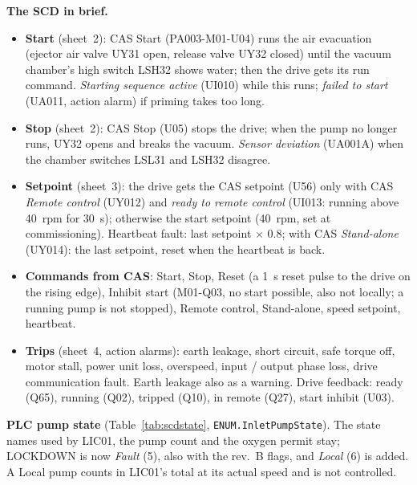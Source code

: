 \documentclass[11pt,a4paper]{article}
\begin{document}
\textbf{The SCD in brief.}
\begin{itemize}[nosep]
  \item \textbf{Start} (sheet~2): CAS Start (PA003-M01-U04) runs the air evacuation (ejector air valve
        UY31 open, release valve UY32 closed) until the vacuum chamber's high switch LSH32 shows water; then
        the drive gets its run command. \emph{Starting sequence active} (UI010) while this runs;
        \emph{failed to start} (UA011, action alarm) if priming takes too long.
  \item \textbf{Stop} (sheet~2): CAS Stop (U05) stops the drive; when the pump no longer runs, UY32 opens
        and breaks the vacuum. \emph{Sensor deviation} (UA001A) when the chamber switches LSL31 and LSH32 disagree.
  \item \textbf{Setpoint} (sheet~3): the drive gets the CAS setpoint (U56) only with CAS \emph{Remote
        control} (UY012) and \emph{ready to remote control} (UI013: running above 40~rpm for 30~s);
        otherwise the start setpoint (40~rpm, set at commissioning). Heartbeat fault: last setpoint
        $\times$ 0.8; with CAS \emph{Stand-alone} (UY014): the last setpoint, reset when the heartbeat is back.
  \item \textbf{Commands from CAS}: Start, Stop, Reset (a 1~s reset pulse to the drive on the rising edge),
        Inhibit start (M01-Q03, no start possible, also not locally; a running pump is not stopped),
        Remote control, Stand-alone, speed setpoint, heartbeat.
  \item \textbf{Trips} (sheet~4, action alarms): earth leakage, short circuit, safe torque off, motor
        stall, power unit loss, overspeed, input / output phase loss, drive communication fault. Earth
        leakage also as a warning. Drive feedback: ready (Q65), running (Q02), tripped (Q10), in remote (Q27),
        start inhibit (U03).
\end{itemize}

\textbf{PLC pump state} (Table~\ref{tab:scdstate}, \texttt{ENUM.InletPumpState}). The state names used
by LIC01, the pump count and the oxygen permit stay; LOCKDOWN is now \emph{Fault} (5), also with the rev.~B
flags, and \emph{Local} (6) is added. A Local pump counts in LIC01's total at its actual speed and is not
controlled.
\end{document}
